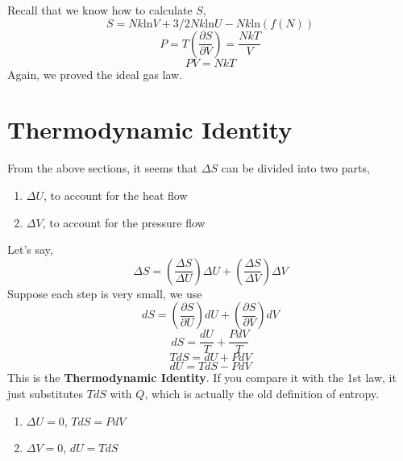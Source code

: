 Recall that we know how to calculate $S$,
\begin{equation} S = Nk\text{ln}V + 3/2Nk\text{ln}U - Nk\text{ln}(f(N)) \end{equation}
\begin{equation} P = T(\frac {\partial{S}} {\partial{V}})  = \frac{NkT}{V}\end{equation}
\begin{equation} PV = NkT \end{equation}
Again, we proved the ideal gas law.

\section{Thermodynamic Identity}
From the above sections, it seems that $\Delta{S}$ can be divided into two parts, 
\begin{enumerate}
\item $\Delta{U}$, to account for the heat flow
\item $\Delta{V}$, to account for the pressure flow
\end{enumerate}

Let's say,
\begin{equation} \Delta{S} = (\frac {\Delta{S}}{\Delta{U}})\Delta{U} + (\frac {\Delta{S}}{\Delta{V}})\Delta{V}  \end{equation}
Suppose each step is very small, we use 
\begin{equation} dS = (\frac{\partial S}{\partial U})dU + (\frac{\partial S}{\partial V})dV  \end{equation}
\begin{equation} dS = \frac{dU}{T} + \frac{PdV}{T}  \end{equation}
\begin{equation} TdS = dU + PdV  \end{equation}
\begin{equation} dU = TdS - PdV  \end{equation}
This is the {\bf Thermodynamic Identity}. If you compare it with the 1st law, it just substitutes $TdS$ with $Q$, which is actually the old definition of entropy.
\begin{enumerate}
\item $\Delta{U}=0$, $TdS=PdV$
\item $\Delta{V}=0$, $dU=TdS$
\end{enumerate}

